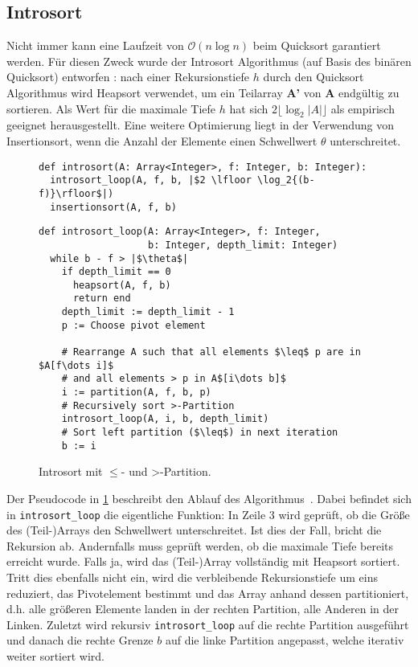 \subsection{Introsort}
\label{section:introsort}

Nicht  immer kann eine Laufzeit von $\mathcal O(n\log{n})$ beim Quicksort garantiert werden.
Für diesen Zweck wurde der Introsort Algorithmus (auf Basis des binären Quicksort) entworfen \cite{Musser97}:
nach einer Rekursionstiefe $h$ durch den Quicksort Algorithmus wird Heapsort verwendet,
um ein Teilarray \textbf{A'} von \textbf{A} endgültig zu sortieren.
Als Wert für die maximale Tiefe $h$ hat sich $2 \lfloor \log_2{|A|}\rfloor$ als empirisch geeignet herausgestellt.
Eine weitere Optimierung liegt in der Verwendung von Insertionsort,
wenn die Anzahl der Elemente einen Schwellwert $\theta$ unterschreitet.

\begin{figure}
\begin{verbatim}
def introsort(A: Array<Integer>, f: Integer, b: Integer):
  introsort_loop(A, f, b, |$2 \lfloor \log_2{(b-f)}\rfloor$|)
  insertionsort(A, f, b)
\end{verbatim}

\begin{verbatim}
def introsort_loop(A: Array<Integer>, f: Integer,
                   b: Integer, depth_limit: Integer)
  while b - f > |$\theta$|
    if depth_limit == 0
      heapsort(A, f, b)
      return end
    depth_limit := depth_limit - 1
    p := Choose pivot element

    # Rearrange A such that all elements $\leq$ p are in $A[f\dots i]$
    # and all elements > p in A$[i\dots b]$
    i := partition(A, f, b, p)
    # Recursively sort >-Partition
    introsort_loop(A, i, b, depth_limit)
    # Sort left partition ($\leq$) in next iteration
    b := i

\end{verbatim}
\caption{Introsort mit \glqq $\leq$\grqq- und \glqq >\grqq-Partition.}
\label{alg:introsort}
\end{figure}

Der Pseudocode in \ref{alg:introsort} beschreibt den Ablauf des Algorithmus~\cite{Musser97}.
Dabei befindet sich in \texttt{introsort\_loop} die eigentliche Funktion: In Zeile 3 wird geprüft,
ob die Größe des (Teil-)Arrays den Schwellwert unterschreitet. Ist dies der Fall, bricht die Rekursion ab.
Andernfalls muss geprüft werden, ob die maximale Tiefe bereits erreicht wurde.
Falls ja, wird das (Teil-)Array vollständig mit Heapsort sortiert.
Tritt dies ebenfalls nicht ein, wird die verbleibende Rekursionstiefe um eins reduziert,
das Pivotelement bestimmt und das Array anhand dessen partitioniert,
d.h. alle größeren Elemente landen in der rechten Partition, alle Anderen in der Linken.
Zuletzt wird rekursiv \texttt{introsort\_loop} auf die rechte Partition ausgeführt
und danach die rechte Grenze $b$ auf die linke Partition angepasst, welche iterativ weiter sortiert wird.

